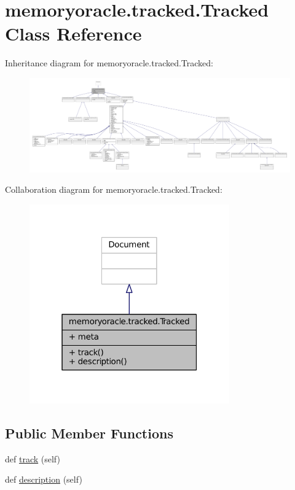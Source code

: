 \hypertarget{classmemoryoracle_1_1tracked_1_1Tracked}{}\section{memoryoracle.\+tracked.\+Tracked Class Reference}
\label{classmemoryoracle_1_1tracked_1_1Tracked}


Inheritance diagram for memoryoracle.\+tracked.\+Tracked\+:
\nopagebreak
\begin{figure}[H]
\begin{center}
\leavevmode
\includegraphics[width=350pt]{classmemoryoracle_1_1tracked_1_1Tracked__inherit__graph}
\end{center}
\end{figure}


Collaboration diagram for memoryoracle.\+tracked.\+Tracked\+:
\nopagebreak
\begin{figure}[H]
\begin{center}
\leavevmode
\includegraphics[width=244pt]{classmemoryoracle_1_1tracked_1_1Tracked__coll__graph}
\end{center}
\end{figure}
\subsection*{Public Member Functions}
\begin{DoxyCompactItemize}
\item 
def \hyperlink{classmemoryoracle_1_1tracked_1_1Tracked_ae7ce69b8e953576f9859666889a62f1e}{track} (self)
\item 
def \hyperlink{classmemoryoracle_1_1tracked_1_1Tracked_abd8dc997fb5a226926f2044462dbd94b}{description} (self)
\end{DoxyCompactItemize}
